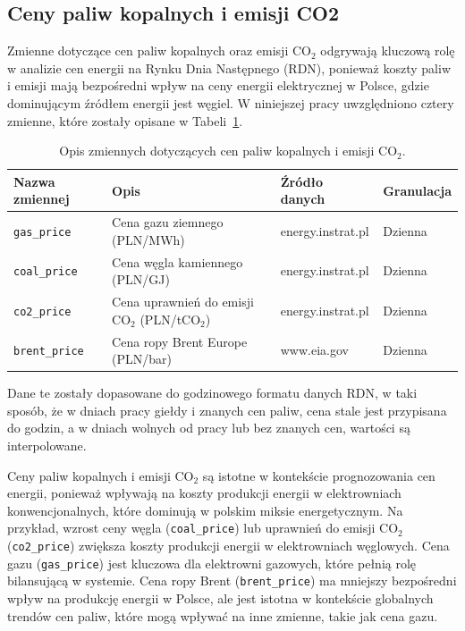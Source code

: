 \subsection{Ceny paliw kopalnych i emisji CO2}
\label{subsec:prices}

Zmienne dotyczące cen paliw kopalnych oraz emisji CO$_2$ odgrywają kluczową rolę w analizie cen energii na Rynku Dnia Następnego (RDN), ponieważ koszty paliw i emisji mają bezpośredni wpływ na ceny energii elektrycznej w Polsce, gdzie dominującym źródłem energii jest węgiel. W niniejszej pracy uwzględniono cztery zmienne, które zostały opisane w Tabeli~\ref{tab:fuel_variables}.

\begin{table}[H]
    \centering
    \begin{tabular}{|l|l|l|l|}
    \hline
    \textbf{Nazwa zmiennej} & \textbf{Opis} & \textbf{Źródło danych} & \textbf{Granulacja} \\ \hline
    \texttt{gas\_price}     & Cena gazu ziemnego (PLN/MWh) & energy.instrat.pl & Dzienna \\ \hline
    \texttt{coal\_price}    & Cena węgla kamiennego (PLN/GJ) & energy.instrat.pl & Dzienna \\ \hline
    \texttt{co2\_price}     & Cena uprawnień do emisji CO$_2$ (PLN/tCO$_2$) & energy.instrat.pl & Dzienna \\ \hline
    \texttt{brent\_price}   & Cena ropy Brent Europe (PLN/bar) & www.eia.gov & Dzienna \\ \hline
    \end{tabular}
    \caption{Opis zmiennych dotyczących cen paliw kopalnych i emisji CO$_2$.}
    \label{tab:fuel_variables}
\end{table}

Dane te zostały dopasowane do godzinowego formatu danych RDN, w taki sposób, że w dniach pracy giełdy i znanych cen paliw, cena stale jest przypisana do godzin, a w dniach wolnych od pracy lub bez znanych cen, wartości są interpolowane. 

Ceny paliw kopalnych i emisji CO$_2$ są istotne w kontekście prognozowania cen energii, ponieważ wpływają na koszty produkcji energii w elektrowniach konwencjonalnych, które dominują w polskim miksie energetycznym. Na przykład, wzrost ceny węgla (\texttt{coal\_price}) lub uprawnień do emisji CO$_2$ (\texttt{co2\_price}) zwiększa koszty produkcji energii w elektrowniach węglowych. Cena gazu (\texttt{gas\_price}) jest kluczowa dla elektrowni gazowych, które pełnią rolę bilansującą w systemie. Cena ropy Brent (\texttt{brent\_price}) ma mniejszy bezpośredni wpływ na produkcję energii w Polsce, ale jest istotna w kontekście globalnych trendów cen paliw, które mogą wpływać na inne zmienne, takie jak cena gazu.

